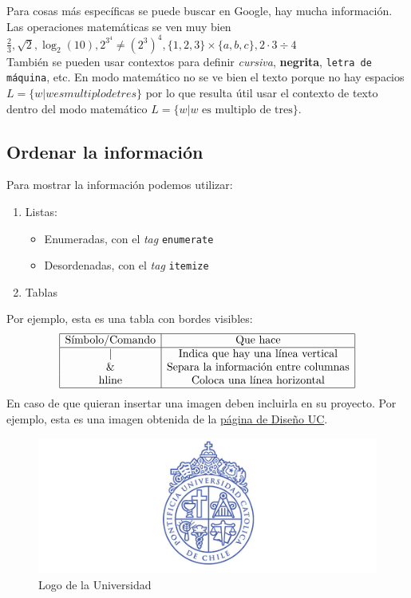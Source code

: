 \documentclass[12pt]{article}
\begin{document}
Para cosas más específicas se puede buscar en Google, hay mucha información. Las operaciones matemáticas se ven muy bien $\frac{2}{3}, \sqrt{2}, \log_{2}(10), 2^{3^{4}} \neq (2^{3})^{4}, \{1, 2, 3\} \times \{a, b, c\}, 2 \cdot 3 \div 4$\\

También se pueden usar contextos para definir \textit{cursiva}, \textbf{negrita}, \texttt{letra de máquina}, etc. En modo matemático no se ve bien el texto porque no hay espacios $L = \{ w | w es multiplo de tres\}$ por lo que resulta útil usar el contexto de texto dentro del modo matemático $L = \{ w | w \text{ es multiplo de tres}\}$.

\subsection*{Ordenar la información}
Para mostrar la información podemos utilizar:
\begin{enumerate}
		        \item Listas:
		        \begin{itemize}
		            \item Enumeradas, con el \textit{tag} \texttt{enumerate}
		            \item Desordenadas, con el \textit{tag} \texttt{itemize}
		        \end{itemize}
		        \item Tablas
		    \end{enumerate}

Por ejemplo, esta es una tabla con bordes visibles:
		    \[
		    \begin{array}{|c|c|}
		    \hline
		         \text{Símbolo/Comando} & \text{Que hace}  \\ \hline
		         \text{|} & \text{Indica que hay una línea vertical} \\
		         \text{\&} & \text{Separa la información entre columnas} \\
		         \text{hline} & \text{Coloca una línea horizontal} \\
		         \hline
		    \end{array}
		    \]
En caso de que quieran insertar una imagen deben incluirla en su proyecto. Por ejemplo, esta es una imagen obtenida de la \href{https://diseno.uc.cl/lineas-investigacion/lineas-de-investigacion/diseno-grafico-y-comunicacion-visual/escudo-uc/}{\color{blue}página de Diseño UC}.\\
\begin{figure}[h]
    \centering
    \includegraphics[width=\textwidth]{uc.jpg}
    \caption{Logo de la Universidad}
    \label{fig:my_label}
\end{figure}

\newpage
\end{document}
